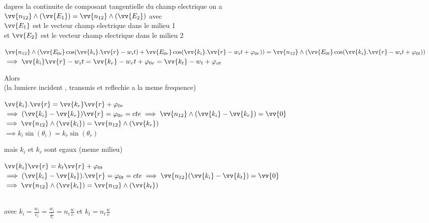 \documentclass[12pt]{book}
\begin{document}
                \begin{center}
                    dapres la continuite de composant tangentielle du champ electrique on a \\
                    $ \vv{n_{12}}\wedge(\vv{E_1}) = \vv{n_{12}}\wedge(\vv{E_2}) $ avec \\ $\vv{E_1} $ est le vecteur champ electrique dans le milieu 1 \\ et $\vv{E_2} $ est le vecteur champ electrique dans le milieu 2
                \end{center}
                    $ \vv{n_{12}}\wedge(\vv{E_{0i}}\cos(\vv{k_i}.\vv{r}-w_it) +  \vv{E_{0r}}\cos(\vv{k_i}.\vv{r}-w_it + \varphi_{0r})) = \vv{n_{12}}\wedge( \vv{E_{0t}}\cos(\vv{k_i}.\vv{r}-w_it + \varphi_{0t})) $
                    \\ $\implies \vv{k_i}\vv{r}-w_it =\vv{k_r}-w_rt + \varphi_{0r} = \vv{k_t} -w_t + \varphi_{ot}$
                    \begin{center}
                        Alors   \\ 
                        (la lumiere incident , transmis et reflechie a la meme frequence)
                    \end{center}
                $\vv{k_i}.\vv{r}=\vv{k_r}\vv{r}+ \varphi_{0r}$ \\
                $\implies(\vv{k_i}-\vv{k_r})\vv{r} = \varphi_{0r}= cte \implies \vv{n_{12}} \wedge(\vv{k_i}-\vv{k_r}) = \vv{0}$ \\
                $\implies \vv{n_{12}} \wedge(\vv{k_i}) = \vv{n_{12}}\wedge(\vv{k_r})$ \\
                $\implies k_i\sin(\theta_i) = k_r\sin(\theta_r)$ \\
                \begin{center}
                    mais $k_i$ et $k_r$ sont egaux (meme milieu) \\
                \end{center}
                $ \vv{k_i}\vv{r} = k_t\vv{r} + \varphi_{0t} $\\ 
                $\implies(\vv{k_i}-\vv{k_t}).\vv{r} = \varphi_{0t} = cte \implies \vv{n_{12}} (\vv{k_i}-\vv{k_t}) = \vv{0}$
                $\implies \vv{n_{12}} \wedge(\vv{k_i}) = \vv{n_{12}}\wedge(\vv{k_t})$ \\
                \begin{center}
                     \\
                    avec $k_i = \frac{w_i}{v_i} =\frac{w_i}{\frac{c}{n_i}}=n_i\frac{w}{c} $ et $k_t=n_t \frac{w}{c}$
                \end{center} 
\end{document}
